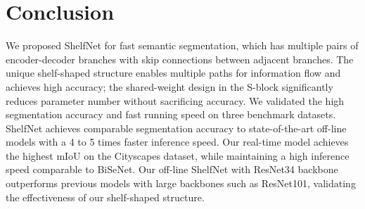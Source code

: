 \documentclass[10pt,twocolumn,letterpaper]{article}
\begin{document}
\section{Conclusion}
We proposed ShelfNet for fast semantic segmentation, which has multiple pairs of encoder-decoder branches with skip connections between adjacent branches. The unique shelf-shaped structure enables multiple paths for information flow and achieves high accuracy; the shared-weight design in the S-block significantly reduces parameter number without sacrificing accuracy. We validated the high segmentation accuracy and fast running speed on three benchmark datasets. ShelfNet achieves comparable segmentation accuracy to state-of-the-art off-line models with a 4 to 5 times faster inference speed. Our real-time model achieves the highest mIoU on the Cityscapes dataset, while maintaining a high inference speed comparable to BiSeNet. Our off-line ShelfNet with ResNet34 backbone outperforms previous models with large backbones such as ResNet101, validating the effectiveness of our shelf-shaped structure.

{\small


}
\end{document}
